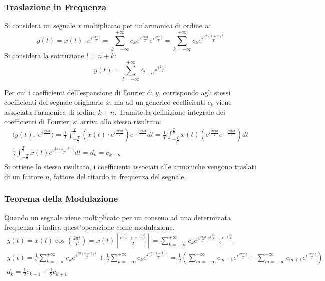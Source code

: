 \documentclass{article}
\numberwithin{equation}{subsection}
\begin{document}
\subsubsection{Traslazione in Frequenza}

Si considera un segnale $x$ moltiplicato per un'armonica di ordine $n$:
\begin{equation*}
    y(t)=x(t)\cdot e^{i\frac{2\pi nt}{T}}=\displaystyle\sum_{k=-\infty}^{+\infty}c_ke^{i\frac{2\pi kt}{T}}e^{i\frac{2\pi nt}{T}}=\sum_{k=-\infty}^{+\infty}c_ke^{i\frac{2\pi (k+n)t}{T}}
\end{equation*}
Si considera la sotituzione $l=n+k$:
\begin{equation*}
    y(t)=\displaystyle\sum_{l=-\infty}^{+\infty}c_{l-n}e^{i\frac{2\pi lt}{T}}
\end{equation*}

Per cui i coefficienti dell'espansione di Fourier di $y$, corrispondo agli stessi coefficienti del segnale originario $x$, ma ad un generico coefficienti $c_k$ viene 
associata l'armonica di ordine $k+n$.   
Tramite la definizione integrale dei coefficienti di Fourier, si arriva allo stesso risultato:
\begin{gather*}
    \langle y(t),\;e^{i\frac{2\pi kt}{T}}\rangle=\displaystyle\frac{1}{T}\int_{-\frac{T}{2}}^{\frac{T}{2}}\left(x(t)\cdot e^{i\frac{2\pi nt}{T}}\right)e^{-i\frac{2\pi kt}{T}}dt=\frac{1}{T}\int_{-\frac{T}{2}}^{\frac{T}{2}}x(t)\left(e^{i\frac{2\pi nt}{T}}e^{-i\frac{2\pi kt}{T}}\right)dt\\
    \displaystyle\frac{1}{T}\int_{-\frac{T}{2}}^{\frac{T}{2}}x(t)e^{i\frac{2\pi (n-k)t}{T}}dt=d_k=c_{k-n}
\end{gather*}
Si ottiene lo stesso risultato, i coefficienti associati alle armoniche vengono traslati di un fattore $n$, fattore del ritardo in frequenza del segnale.  

\subsubsection{Teorema della Modulazione}

Quando un segnale viene moltiplicato per un conseno ad una determinata frequenza si indica quest'operazione come modulazione. 
\begin{gather*}
    y(t)=x(t)\cos\displaystyle\left(\frac{2\pi t}{T}\right)=x(t)\left[\frac{e^{i\frac{2\pi t}{T}}+e^{-i\frac{2\pi t}{T}}}{2}\right]=\sum_{k=-\infty}^{+\infty}c_ke^{i\frac{2\pi kt}{T}}\frac{e^{i\frac{2\pi t}{T}}+e^{-i\frac{2\pi t}{T}}}{2}\\
    y(t)=\displaystyle\frac{1}{2}\sum_{k=-\infty}^{+\infty}c_ke^{i\frac{2\pi (k+1)t}{T}}+\frac{1}{2}\sum_{k=-\infty}^{+\infty}c_ke^{i\frac{2\pi (k-1)t}{T}}=\frac{1}{2}\left(\sum_{m=-\infty}^{+\infty}c_{m-1}e^{i\frac{2\pi mt}{T}}+\sum_{m=-\infty}^{+\infty}c_{m+1}e^{i\frac{2\pi mt}{T}}\right)\\
    d_k=\displaystyle\frac{1}{2}c_{k-1}+\frac{1}{2}c_{k+1}
\end{gather*}
\end{document}
